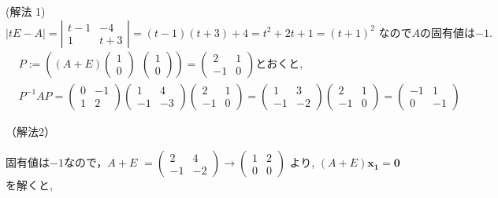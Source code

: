 \documentclass{jsarticle}
\begin{document}
(解法 1)
\[
|t E-A|=\left|\begin{array}{cc}
t-1 & -4 \\
1 & t+3
\end{array}\right|=(t-1)(t+3)+4=t^2+2 t+1=(t+1)^2 \text { なので$A$の固有値は$-1$} .
\]
\( \begin{aligned} & P:=\left((A+E)\left(\begin{array}{ll}1 \\ 0\end{array}\right) \ \   \left(\begin{array}{l}1 \\ 0\end{array}\right)\right)=\left(\begin{array}{cc}2 & 1 \\ -1 & 0\end{array}\right) とおくと, \\ & P^{-1} A P=\left(\begin{array}{cc}0 & -1 \\ 1 & 2\end{array}\right)\left(\begin{array}{cc}1 & 4 \\ -1 & -3\end{array}\right)\left(\begin{array}{cc}2 & 1 \\ -1 & 0\end{array}\right)=\left(\begin{array}{cc}1 & 3 \\ -1 & -2\end{array}\right)\left(\begin{array}{cc}2 & 1 \\ -1 & 0\end{array}\right)=\left(\begin{array}{cc}-1 & 1 \\ 0 & -1\end{array}\right)\end{aligned} \)

\bigskip
\bigskip

（解法2）

固有値は$-1$なので，$A+E$ \( =\left(\begin{array}{cc}2 & 4 \\ -1 & -2\end{array}\right) \rightarrow\left(\begin{array}{ll}1 & 2 \\ 0 & 0\end{array}\right) \) より, 
$(A+E) \bm{x_1}=\bm{0}$ を解くと, 
\end{document}
